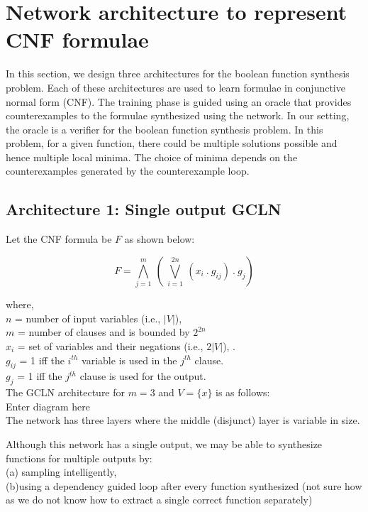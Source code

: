 \clearpage
\section{Network architecture to represent CNF formulae}

In this section,  we design three architectures for the boolean function synthesis problem. Each of these architectures are used to learn formulae in conjunctive normal form (CNF).  The training phase is guided using an oracle that provides counterexamples to the formulae synthesized using the network.  In our setting, the oracle is a verifier for the boolean function synthesis problem.  In this problem,  for a given function, there could be multiple solutions possible and hence multiple local minima.  The choice of minima depends on the counterexamples generated by the counterexample loop.

\subsection{Architecture 1: Single output GCLN}

Let the CNF formula be $F$ as shown below:

\[ F = \bigwedge_{j = 1}^m \ (\  \bigvee_{i=1}^{2n}\  (x_i\ .\ g_{ij})\ .\ g_j)\]

where,  \\ 
$n$ = number of input variables (i.e.,  $|V|$), \\
$m$ = number of clauses and is bounded by $2^{2n}$ \\
$x_i$ = set of variables and their negations (i.e.,  $2|V|$), .\\
$g_{ij}$ = 1 iff the $i^{th}$ variable is used in the $j^{th}$ clause.\\
$g_{j}$ = 1 iff the $j^{th}$ clause is used for the output.\\

The GCLN architecture for $m = 3$ and $V = \{ x\}$ is as follows: \\

Enter diagram here \\

The network has three layers where the middle (disjunct) layer is variable in size.

Although this network has a single output,  we may be able to synthesize functions for multiple outputs by:\\
(a) sampling intelligently,  \\
(b)using a dependency guided loop after every function synthesized (not sure how as we do not know how to extract a single correct function separately)



